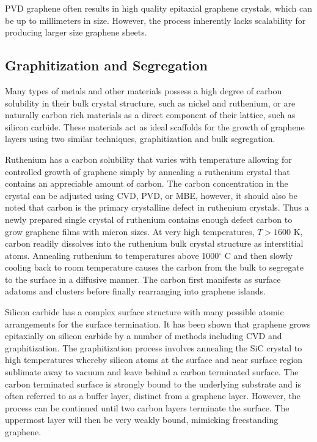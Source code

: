 PVD graphene often results in high quality epitaxial graphene crystals, which can be up to millimeters in size. However, the process inherently lacks scalability for producing larger size graphene sheets.

\subsection{Graphitization and Segregation}
Many types of metals and other materials possess a high degree of carbon solubility in their bulk crystal structure, such as nickel and ruthenium, or are naturally carbon rich materials as a direct component of their lattice, such as silicon carbide. These materials act as ideal scaffolds for the growth of graphene layers using two similar techniques, graphitization and bulk segregation.

Ruthenium has a carbon solubility that varies with temperature allowing for controlled growth of graphene simply by annealing a ruthenium crystal that contains an appreciable amount of carbon. The carbon concentration in the crystal can be adjusted using CVD, PVD, or MBE, however, it should also be noted that carbon is the primary crystalline defect in ruthenium crystals. Thus a newly prepared single crystal of ruthenium contains enough defect carbon to grow graphene films with micron sizes. At very high temperatures, $ T > 1600$ K, carbon readily dissolves into the ruthenium bulk crystal structure as interstitial atoms. Annealing ruthenium to temperatures above 1000$^\circ$ C and then slowly cooling back to room temperature causes the carbon from the bulk to segregate to the surface in a diffusive manner. The carbon first manifests as surface adatoms and clusters before finally rearranging into graphene islands.

Silicon carbide has a complex surface structure with many possible atomic arrangements for the surface termination. It has been shown that graphene grows epitaxially on silicon carbide by a number of methods including CVD and graphitization. The graphitization process involves annealing the SiC crystal to high temperatures whereby silicon atoms at the surface and near surface region sublimate away to vacuum and leave behind a carbon terminated surface. The carbon terminated surface is strongly bound to the underlying substrate and is often referred to as a buffer layer, distinct from a graphene layer. However, the process can be continued until two carbon layers terminate the surface. The uppermost layer will then be very weakly bound, mimicking freestanding graphene. 

